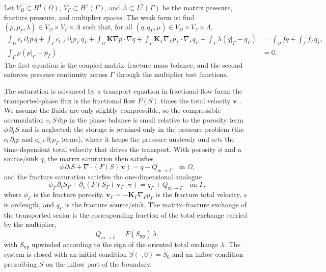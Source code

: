 \documentclass[a4paper,fleqn]{cas-sc}
\newcommand{\Kmat}{\mathbf{K}}
\newcommand{\vflux}{\mathbf{v}}
\begin{document}
Let \(V_\Omega\subset H^1(\Omega)\), \(V_\Gamma\subset H^1(\Gamma)\), and
\(\Lambda\subset L^2(\Gamma)\) be the matrix pressure, fracture pressure, and
multiplier spaces. The weak form is: find
\((p,p_\Gamma,\lambda)\in V_\Omega\times V_\Gamma\times\Lambda\) such that, for
all \((q,q_\Gamma,\mu)\in V_\Omega\times V_\Gamma\times\Lambda\),
\begin{equation}
\begin{aligned}
\int_\Omega c_t\,\partial_t p\,q
+\int_\Gamma c_{t,\Gamma}\,\partial_t p_\Gamma\,q_\Gamma
+\int_\Omega \Kmat\nabla p\cdot\nabla q
+\int_\Gamma \Kmat_\Gamma\nabla_\Gamma p_\Gamma\cdot\nabla_\Gamma q_\Gamma
-\int_\Gamma \lambda\left(q|_\Gamma-q_\Gamma\right)
&=
\int_\Omega f q
+\int_\Gamma f_\Gamma q_\Gamma,\\
\int_\Gamma \mu\left(p|_\Gamma-p_\Gamma\right)&=0.
\end{aligned}
\label{eq:lmdfm_weak}
\end{equation}
The first equation is the coupled matrix--fracture mass balance, and the second
enforces pressure continuity across \(\Gamma\) through the multiplier test
functions.

The saturation is advanced by a transport equation in fractional-flow form: the
transported-phase flux is the fractional flow \(F(S)\) times the total velocity
\(\vflux\) \citep{Lie2019}. We assume the fluids are only
slightly compressible, so the compressible accumulation \(c_t\,S\,\partial_t p\)
in the phase balance is small relative to the porosity term \(\phi\,\partial_t S\)
and is neglected; the storage is retained only in the pressure problem (the
\(c_t\,\partial_t p\) and \(c_{t,\Gamma}\,\partial_t p_\Gamma\) terms), where it
keeps the pressure unsteady and sets the time-dependent total velocity that drives
the transport. With porosity \(\phi\) and a source/sink \(q\), the matrix
saturation then satisfies
\begin{equation}
  \phi\,\partial_t S
  + \nabla\cdot\!\left(F(S)\,\vflux\right)
  = q - Q_{m\to\Gamma}
  \quad\text{in }\Omega ,
\label{eq:transport_matrix}
\end{equation}
and the fracture saturation satisfies the one-dimensional analogue
\begin{equation}
  \phi_\Gamma\,\partial_t S_\Gamma
  + \partial_s\!\left(F(S_\Gamma)\,\vflux_\Gamma\cdot\bm\tau\right)
  = q_\Gamma + Q_{m\to\Gamma}
  \quad\text{on }\Gamma ,
\label{eq:transport_fracture}
\end{equation}
where \(\phi_\Gamma\) is the fracture porosity,
\(\vflux_\Gamma=-\Kmat_\Gamma\nabla_\Gamma p_\Gamma\) is the fracture total
velocity, \(s\) is arclength, and \(q_\Gamma\) is the fracture source/sink. The
matrix--fracture exchange of the transported
scalar is the corresponding fraction of the total exchange carried by the
multiplier,
\[
  Q_{m\to\Gamma} = F(S_{\mathrm{up}})\,\lambda ,
\]
with \(S_{\mathrm{up}}\) upwinded according to the sign of the oriented total
exchange \(\lambda\). The system is closed with an initial condition
\(S(\cdot,0)=S_0\) and an inflow condition prescribing \(S\) on the inflow part of
the boundary.
\end{document}

